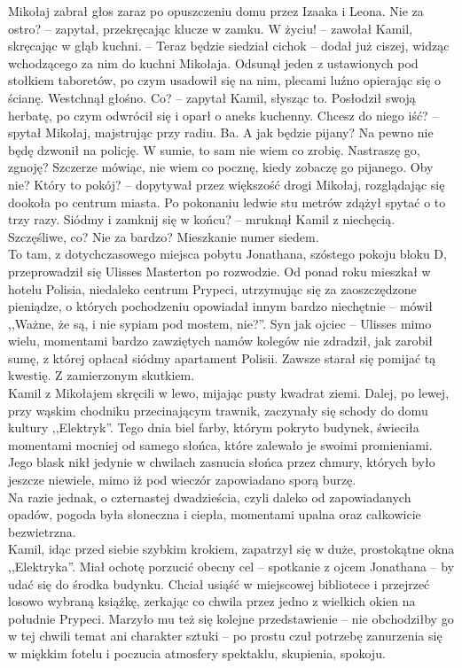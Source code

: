 \documentclass[../MAIN.tex]{subfiles}
\begin{document}
Mikołaj zabrał głos zaraz po opuszczeniu domu przez Izaaka i Leona.
\sx Nie za ostro? -- zapytał, przekręcając klucze w zamku.
\xx W życiu! -- zawołał Kamil, skręcając w głąb kuchni. -- Teraz będzie siedział cicho\3k -- dodał już ciszej, widząc wchodzącego za nim do kuchni Mikołaja. Odsunął jeden z ustawionych pod stołkiem taboretów, po czym usadowił się na nim, plecami luźno opierając się o ścianę. Westchnął głośno.
\xx Co? -- zapytał Kamil, słysząc to. Posłodził swoją herbatę, po czym odwrócił się i oparł o aneks kuchenny.
\xx Chcesz do niego iść? -- spytał Mikołaj, majstrując przy radiu.
\xx Ba.
\xx A jak będzie pijany?
\xx Na pewno nie będę dzwonił na policję. W sumie, to sam nie wiem co zrobię. Nastraszę go, zgnoję? Szczerze mówiąc, nie wiem co pocznę, kiedy zobaczę go pijanego. Oby nie?
\dd
\xx Który to pokój? -- dopytywał przez większość drogi Mikołaj, rozglądając się dookoła po centrum miasta. Po pokonaniu ledwie stu metrów zdążył spytać o to trzy razy.
\xx Siódmy i zamknij się w końcu? -- mruknął Kamil z niechęcią.
\xx Szczęśliwe, co?
\xx Nie za bardzo?
\qd
Mieszkanie numer siedem.\\
To tam, z dotychczasowego miejsca pobytu Jonathana, szóstego pokoju bloku D, przeprowadził się Ulisses Masterton po rozwodzie. Od ponad roku mieszkał w hotelu Polisia, niedaleko centrum Prypeci, utrzymując się za zaoszczędzone pieniądze, o których pochodzeniu opowiadał innym bardzo niechętnie -- mówił ,,Ważne, że są, i nie sypiam pod mostem, nie?''. Syn jak ojciec -- Ulisses mimo wielu, momentami bardzo zawziętych namów kolegów nie zdradził, jak zarobił sumę, z której opłacał siódmy apartament Polisii. Zawsze starał się pomijać tą kwestię. Z zamierzonym skutkiem.\\
Kamil z Mikołajem skręcili w lewo, mijając pusty kwadrat ziemi. Dalej, po lewej, przy wąskim chodniku przecinającym trawnik, zaczynały się schody do domu kultury ,,Elektryk''. Tego dnia biel farby, którym pokryto budynek, świeciła momentami mocniej od samego słońca, które zalewało je swoimi promieniami. Jego blask nikł jedynie w chwilach zasnucia słońca przez chmury, których było jeszcze niewiele, mimo iż pod wieczór zapowiadano sporą burzę.\\
Na razie jednak, o czternastej dwadzieścia, czyli daleko od zapowiadanych opadów, pogoda była słoneczna i ciepła, momentami upalna oraz całkowicie bezwietrzna.\\
Kamil, idąc przed siebie szybkim krokiem, zapatrzył się w duże, prostokątne okna ,,Elektryka''. Miał ochotę porzucić obecny cel -- spotkanie z ojcem Jonathana -- by udać się do środka budynku. Chciał usiąść w miejscowej bibliotece i przejrzeć losowo wybraną książkę, zerkając co chwila przez jedno z wielkich okien na południe Prypeci. Marzyło mu też się kolejne przedstawienie -- nie obchodziłby go w tej chwili temat ani charakter sztuki -- po prostu czuł potrzebę zanurzenia się w miękkim fotelu i poczucia atmosfery spektaklu, skupienia, spokoju.
\end{document}
